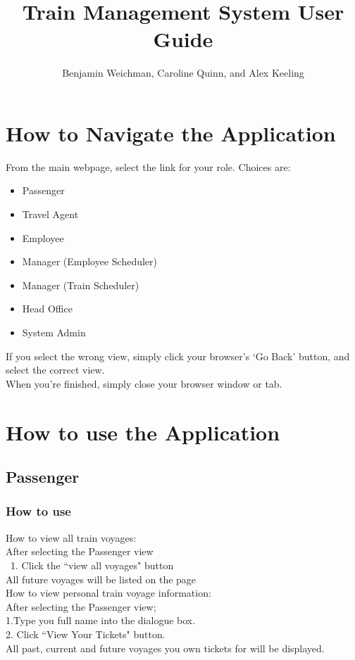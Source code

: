 \documentclass[letter]{article}
\title{Train Management System User Guide}
\author{Benjamin Weichman, Caroline Quinn, and Alex Keeling}
\date{}
\begin{document}
\maketitle

\section{How to Navigate the Application}
From the main webpage, select the link for your role. Choices are: 
\begin{itemize}
\item Passenger
\item Travel Agent
\item Employee
\item Manager (Employee Scheduler)
\item Manager (Train Scheduler)
\item Head Office
\item System Admin
\end{itemize}

If you select the wrong view, simply click your browser's `Go Back' button, and select the correct view. \\

When you're finished, simply close your browser window or tab.


\section{How to use the Application}

\subsection{Passenger}
\subsubsection{How to use}
How to view all train voyages:\\ 
After selecting the Passenger view \\\
1. Click the ``view all voyages" button\\
All future voyages will be listed on the page\\ 

How to view personal train voyage information:\\
After selecting the Passenger view;  \\
1.Type you full name into the dialogue box.\\
2. Click ``View Your Tickets" button.\\
All past, current and future voyages you own tickets for will be displayed. 
\end{document}
